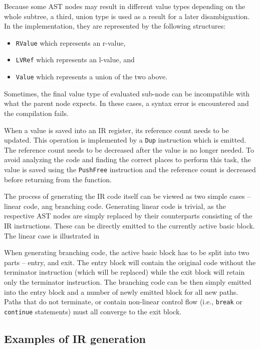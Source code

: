 Because some AST nodes may result in different value types depending on the whole subtree, a third, union type is used as a result for a later disambiguation. In the implementation, they are represented by the following structures:
\begin{itemize}
\item \texttt{RValue} which represents an r-value,
\item \texttt{LVRef} which represents an l-value, and
\item \texttt{Value} which represents a union of the two above.
\end{itemize}

Sometimes, the final value type of evaluated sub-node can be incompatible with what the parent node expects. In these cases, a syntax error is encountered and the compilation fails.

When a value is saved into an IR register, its reference count needs to be updated. This operation is implemented by a \texttt{Dup} instruction which is emitted. The reference count needs to be decreased after the value is no longer needed. To avoid analyzing the code and finding the correct places to perform this task, the value is saved using the \texttt{PushFree} instruction and the reference count is decreased before returning from the function.

The process of generating the IR code itself can be viewed as two simple cases -- linear code, ang branching code. Generating linear code is trivial, as the respective AST nodes are simply replaced by their counterparts consisting of the IR instructions. These can be directly emitted to the currently active basic block. The linear case is illustrated in

When generating branching code, the active basic block has to be split into two parts -- entry, and exit. The entry block will contain the original code without the terminator instruction (which will be replaced) while the exit block will retain only the terminator instruction. The branching code can be then simply emitted into the entry block and a number of newly emitted block for all new paths. Paths that do not terminate, or contain non-linear control flow (i.e., \texttt{break} or \texttt{continue} statements) must all converge to the exit block.

\subsection{Examples of IR generation}

